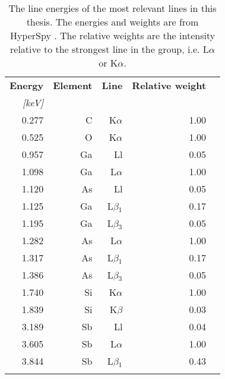 \begin{table}[p]
    \centering
    \caption{
        The line energies of the most relevant lines in this thesis.
        The energies and weights are from HyperSpy \cite{hyperspy_1.7.1}.
        The relative weights are the intensity relative to the strongest line in the group, i.e. L$\alpha$ or K$\alpha$.
    }
    \label{tab:theory:lineEnergies}
    \begin{tabular}{rrrrr}
        \hline
        \textbf{Energy} & \textbf{Element} & \textbf{Line} & \textbf{Relative weight} \\
        \emph{[keV]}    &                  &               &                          \\
        \hline
        0.277           & C                & K$\alpha$     & 1.00                     \\
        0.525           & O                & K$\alpha$     & 1.00                     \\
        0.957           & Ga               & Ll            & 0.05                     \\
        1.098           & Ga               & L$\alpha$     & 1.00                     \\
        1.120           & As               & Ll            & 0.05                     \\
        1.125           & Ga               & L$\beta$$_1$  & 0.17                     \\
        1.195           & Ga               & L$\beta$$_3$  & 0.05                     \\
        1.282           & As               & L$\alpha$     & 1.00                     \\
        1.317           & As               & L$\beta$$_1$  & 0.17                     \\
        1.386           & As               & L$\beta$$_3$  & 0.05                     \\
        1.740           & Si               & K$\alpha$     & 1.00                     \\
        1.839           & Si               & K$\beta$      & 0.03                     \\
        3.189           & Sb               & Ll            & 0.04                     \\
        3.605           & Sb               & L$\alpha$     & 1.00                     \\
        3.844           & Sb               & L$\beta$$_1$  & 0.43                     \\
$$
\end{tabular}
\end{table}
